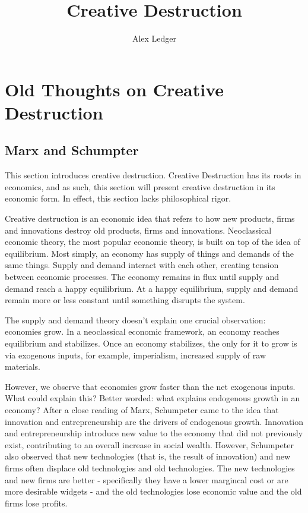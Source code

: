 \documentclass[11pt]{article}
\title{Creative Destruction}
\author{Alex Ledger}
\begin{document}
\maketitle

\section{Old Thoughts on Creative Destruction}
\subsection{Marx and Schumpter}
This section introduces creative destruction.
Creative Destruction has its roots in economics, and as such, this section will present creative destruction in its economic form.
In effect, this section lacks philosophical rigor.

Creative destruction is an economic idea that refers to how new products, firms and innovations destroy old products, firms and innovations.
Neoclassical economic theory, the most popular economic theory, is built on top of the idea of equilibrium.
Most simply, an economy has supply of things and demands of the same things. 
Supply and demand interact with each other, creating tension between economic processes.
The economy remains in flux until supply and demand reach a happy equilibrium.
At a happy equilibrium, supply and demand remain more or less constant until something disrupts the system.

The supply and demand theory doesn't explain one crucial observation: economies grow.
In a neoclassical economic framework, an economy reaches equilibrium and stabilizes.
Once an economy stabilizes, the only for it to grow is via exogenous inputs, for example, imperialism, increased supply of raw materials.

However, we observe that economies grow faster than the net exogenous inputs.
What could explain this?
Better worded: what explains endogenous growth in an economy?
After a close reading of Marx, Schumpeter came to the idea that innovation and entrepreneurship are the drivers of endogenous growth.
Innovation and entrepreneurship introduce new value to the economy that did not previously exist, contributing to an overall increase in social wealth.
However, Schumpeter also observed that new technologies (that is, the result of innovation)  and new firms often displace old technologies and old technologies.
The new technologies and new firms are better - specifically they have a lower margincal cost or are more desirable widgets - and the old technologies lose economic value and the old firms lose profits.
\end{document}
